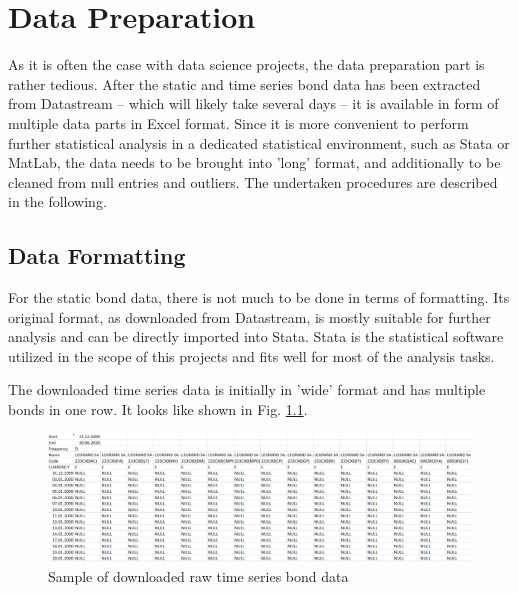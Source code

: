 \chapter{Data Preparation}  \label{chapter:data-preparation}
As it is often the case with data science projects, the data preparation part is rather tedious. After the static and time series bond data has been extracted from Datastream -- which will likely take several days -- it is available in form of multiple data parts in Excel format. Since it is more convenient to perform further statistical analysis in a dedicated statistical environment, such as Stata or MatLab, the data needs to be brought into 'long' format, and additionally to be cleaned from null entries and outliers. The undertaken procedures are described in the following. 

\section{Data Formatting}  \label{section:data-formatting}
For the static bond data, there is not much to be done in terms of formatting. Its original format, as downloaded from Datastream, is mostly suitable for further analysis and can be directly imported into Stata. Stata is the statistical software utilized in the scope of this projects and fits well for most of the analysis tasks. 

The downloaded time series data is initially in 'wide' format and has multiple bonds in one row. It looks like shown in Fig. \ref{fig:original-excel-ts-data}. 

\begin{figure}[h]
	\centering
	\includegraphics[width=1.0\linewidth]{figures/original-excel-ts-data}
	\caption{Sample of downloaded raw time series bond data}
	\label{fig:original-excel-ts-data}
\end{figure}


